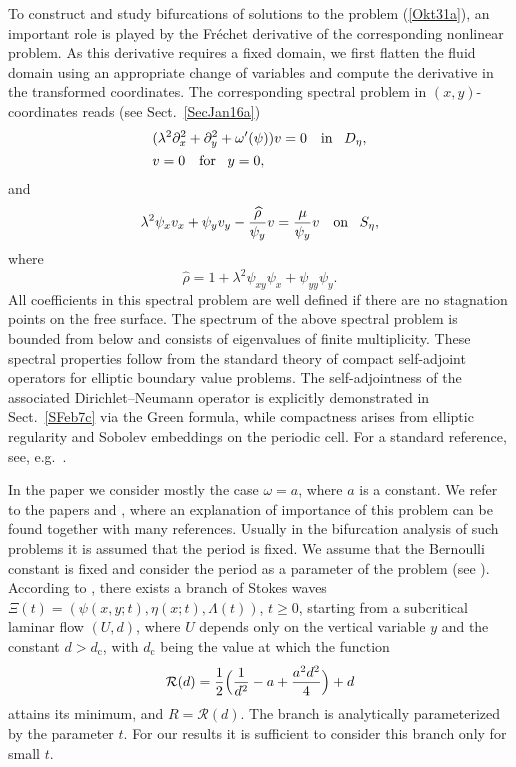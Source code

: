\documentclass[oneside,a4paper,11pt]{article}
\theoremstyle{thmstyletwo}%
\theoremstyle{thmstylethree}%
\numberwithin{equation}{section}
\def\dcrit{d_{\textrm{c}}}
\begin{document}
To construct and study bifurcations of solutions to the problem (\ref{Okt31a}), an important role is played by the Fr\'{e}chet derivative of the corresponding nonlinear problem.  As this derivative requires a fixed domain, we first flatten the fluid domain using an appropriate change of variables and compute the derivative in the transformed coordinates. The corresponding spectral problem in $(x,y)$-coordinates reads (see Sect.~\ref{SecJan16a})
\begin{equation}\label{Au5a}
\begin{aligned}
& (\lambda^2\partial_x^2+\partial_y^2+\omega'(\psi))v=0\quad\mbox{in\!}\quad D_\eta,\\
&v=0\quad\mbox{for\!}\quad y=0,
\end{aligned}
\end{equation}
and
\begin{equation}\label{Dec27a}
\lambda^2\psi_xv_x+\psi_yv_y-\frac{\widehat{\rho}}{\psi_y} v=\frac{\mu}{\psi_y} v\quad\mbox{on\!}\quad S_\eta,
\end{equation}
where
\begin{equation}
\label{eq:rhohatdef}
\widehat{\rho}=1+\lambda^2\psi_{xy}\psi_x+\psi_{yy}\psi_y.
\end{equation}
All coefficients in this spectral problem are well defined if there are no stagnation points on the free surface. The spectrum of the above spectral problem  is bounded from below and consists of eigenvalues of finite multiplicity. These spectral properties follow from the standard theory of compact self-adjoint operators for elliptic boundary value problems. The self-adjointness of the associated Dirichlet--Neumann operator is explicitly demonstrated in Sect.~\ref{SFeb7c} via the Green formula, while compactness arises from elliptic regularity and Sobolev embeddings on the periodic cell. For a standard reference, see, e.g.\ \cite[\S\,8.12]{GilbargTrudinger1983}.

In the paper we consider mostly the case $\omega=a$, where $a$ is a constant. We refer to the papers \cite{CVar} and \cite{CSrVar}, where an explanation of importance of this problem can be found together with many references. Usually in the bifurcation analysis of such problems it is assumed that the period is fixed. We assume that the Bernoulli constant is fixed and consider the period as a parameter of the problem (see \cite{KN11a}). According to \cite{KN14, Var23}, there exists a branch of Stokes waves $\Xi(t)=(\psi(x,y;t),\eta(x;t),\Lambda(t))$, $t\geq 0$,  starting from a subcritical laminar flow $(U,d)$, where $U$ depends only on the vertical variable $y$ and the constant $d>\dcrit$, with $\dcrit$ being the value at which the function
$$
\mathcal{R}(d)=\frac{1}{2}\Bigl(\frac{1}{d^2}-a+\frac{a^2d^2}{4}\Bigr)+d
$$
attains its minimum, and $R=\mathcal{R}(d)$. The branch is analytically parameterized by the parameter $t$. For our results it is sufficient to consider this branch only for small $t$.
\end{document}
